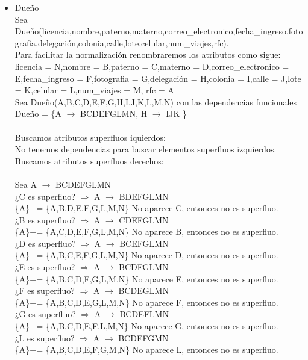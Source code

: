 \documentclass{article}
\begin{document}
\begin{itemize}
\item Dueño\\
Sea Dueño(licencia,nombre,paterno,materno,correo\_electronico,fecha\_ingreso,fotografia,delegación,colonia,calle,lote,celular,num\_viajes,rfc).\\
Para facilitar la normalización renombraremos los atributos como sigue:
licencia = N,nombre = B,paterno = C,materno = D,correo\_electronico = E,fecha\_ingreso = F,fotografia = G,delegación = H,colonia = I,calle = J,lote = K,celular = L,num\_viajes = M, rfc = A\\
Sea Dueño(A,B,C,D,E,F,G,H,I,J,K,L,M,N) con las dependencias funcionales 
Dueño = \{A $\rightarrow$ BCDEFGLMN, H $\rightarrow$ IJK  \} \\
\\
Buscamos atributos superfluos iquierdos:\\
No tenemos dependencias para buscar elementos superfluos izquierdos.\\
Buscamos atributos superfluos derechos:\\
\\
Sea A $\rightarrow$ BCDEFGLMN\\
¿C es superfluo? $\Rightarrow$ A $\rightarrow$ BDEFGLMN \\
\{A\}+= \{A,B,D,E,F,G,L,M,N\} No aparece C, entonces no es superfluo.\\
¿B es superfluo? $\Rightarrow$ A $\rightarrow$ CDEFGLMN \\
\{A\}+= \{A,C,D,E,F,G,L,M,N\} No aparece B, entonces no es superfluo.\\
¿D es superfluo? $\Rightarrow$ A $\rightarrow$ BCEFGLMN \\
\{A\}+= \{A,B,C,E,F,G,L,M,N\}  No aparece D, entonces no es superfluo.\\
¿E es superfluo? $\Rightarrow$ A $\rightarrow$ BCDFGLMN \\
\{A\}+= \{A,B,C,D,F,G,L,M,N\}  No aparece E, entonces no es superfluo.\\
¿F es superfluo? $\Rightarrow$ A $\rightarrow$ BCDEGLMN \\
\{A\}+= \{A,B,C,D,E,G,L,M,N\}  No aparece F, entonces no es superfluo.\\
¿G es superfluo? $\Rightarrow$ A $\rightarrow$ BCDEFLMN \\
\{A\}+= \{A,B,C,D,E,F,L,M,N\}  No aparece G, entonces no es superfluo.\\
¿L es superfluo? $\Rightarrow$ A $\rightarrow$ BCDEFGMN \\
\{A\}+= \{A,B,C,D,E,F,G,M,N\}  No aparece L, entonces no es superfluo.\\

\end{itemize}
\end{document}
